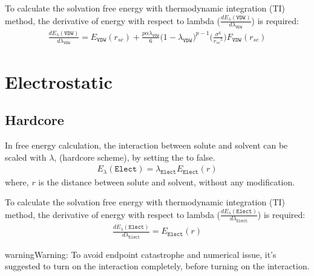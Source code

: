 \documentclass[letterpaper,10pt,english]{sphinxmanual}
\begin{document}
\sphinxAtStartPar
To calculate the solvation free energy with thermodynamic integration (TI) method, the derivative of energy with
respect to lambda (\(\frac{dE_{\lambda}(\texttt{VDW})}{d\lambda_{\texttt{VDW}}}\)) is required:
\begin{equation*}
\begin{split}\frac{dE_{\lambda}(\texttt{VDW})}{d\lambda_{\texttt{VDW}}} = E_{\texttt{VDW}}(r_{sc}) + \frac{p \alpha \lambda_{\texttt{VDW}}}{6} \bigg(1 - \lambda_{\texttt{VDW}}\bigg)^{p-1} \bigg(\frac{{\sigma}^6}{{r_{sc}}^5} \bigg) F_{\texttt{VDW}}(r_{sc})\end{split}
\end{equation*}

\section{Electrostatic}
\label{\detokenize{free_energy:electrostatic}}

\subsection{Hard\sphinxhyphen{}core}
\label{\detokenize{free_energy:hard-core}}
\sphinxAtStartPar
In free energy calculation, the  interaction between solute and solvent can be scaled with \(\lambda\),  (hard\sphinxhyphen{}core scheme),
by setting the  to false.
\begin{equation*}
\begin{split}E_{\lambda}(\texttt{Elect}) = \lambda_{\texttt{Elect}} E_{\texttt{Elect}}(r)\end{split}
\end{equation*}
\sphinxAtStartPar
where, \(r\) is the distance between solute and solvent, without any modification.

\sphinxAtStartPar
To calculate the solvation free energy with thermodynamic integration (TI) method, the derivative of energy with
respect to lambda (\(\frac{dE_{\lambda}(\texttt{Elect})}{d\lambda_{\texttt{Elect}}}\)) is required:
\begin{equation*}
\begin{split}\frac{dE_{\lambda}(\texttt{Elect})}{d\lambda_{\texttt{Elect}}} = E_{\texttt{Elect}}(r)\end{split}
\end{equation*}
\begin{sphinxadmonition}{warning}{Warning:}
\sphinxAtStartPar
To avoid end\sphinxhyphen{}point catastrophe and numerical issue, it’s suggested to turn on the  interaction completely, before turning
on the  interaction.
\end{sphinxadmonition}
\end{document}
